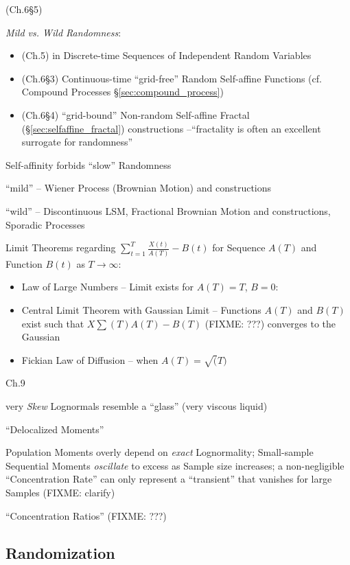 (Ch.6\S5)

\emph{Mild vs. Wild Randomness}:
\begin{itemize}
  \item (Ch.5) in Discrete-time Sequences of Independent Random Variables
  \item (Ch.6\S3) Continuous-time ``grid-free'' Random Self-affine Functions
    (cf. Compound Processes \S\ref{sec:compound_process})
  \item (Ch.6\S4) ``grid-bound'' Non-random Self-affine Fractal
    (\S\ref{sec:selfaffine_fractal}) constructions --``fractality is often an
    excellent surrogate for randomness''
\end{itemize}

Self-affinity forbids ``slow'' Randomness

``mild'' -- Wiener Process (Brownian Motion) and constructions

``wild'' -- Discontinuous LSM, Fractional Brownian Motion and constructions,
Sporadic Processes

Limit Theorems regarding $\sum_{t=1}^T \frac{X(t)}{A(T)} - B(t)$ for Sequence
$A(T)$ and Function $B(t)$ as $T \to \infty$:
\begin{itemize}
  \item Law of Large Numbers -- Limit exists for $A(T) = T$, $B = 0$:
  \item Central Limit Theorem with Gaussian Limit -- Functions $A(T)$ and $B(T)$
    exist such that $X \sum(T)A(T) - B(T)$ (FIXME: ???) converges to the
    Gaussian
  \item Fickian Law of Diffusion -- when $A(T) = \sqrt(T)$
\end{itemize}

Ch.9

very \emph{Skew} Lognormals resemble a ``glass'' (very viscous liquid)

``Delocalized Moments''

Population Moments overly depend on \emph{exact} Lognormality; Small-sample
Sequential Moments \emph{oscillate} to excess as Sample size increases; a
non-negligible ``Concentration Rate'' can only represent a ``transient'' that
vanishes for large Samples (FIXME: clarify)

``Concentration Ratios'' (FIXME: ???)



\subsection{Randomization}\label{sec:randomization}

